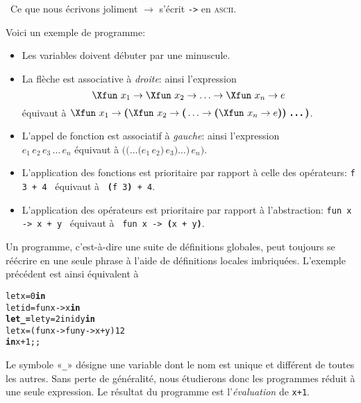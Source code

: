 \noindent\remarques \ Ce que nous écrivons joliment $\rightarrow$ s'écrit
\verb+->+ en \textsc{ascii}.

\bigskip

\noindent Voici un exemple de programme:

{\small
{}




}

\bigskip

\noindent\remarques

\begin{itemize}

  \item Les variables doivent débuter par une minuscule.

  \item La flèche est associative à \emph{droite}: ainsi l'expression
    \begin{equation*}
      \Xfun \,\, x_1 \rightarrow \Xfun \,\, x_2 \rightarrow \ldots
      \rightarrow \Xfun \,\, x_n \rightarrow e
    \end{equation*}
    équivaut à
     \(\Xfun \,\, x_1 \rightarrow \textbf{(}\Xfun \,\, x_2 \rightarrow
     \textbf{(}\ldots \rightarrow \textbf{(}\Xfun \,\, x_n \rightarrow
  e\textbf{)) \ldots)}\).


  \item L'appel de fonction est associatif à \emph{gauche}:
    ainsi l'expression\\
    \(e_1 \, e_2 \, e_3 \, \ldots \, e_n\)
    équivaut à \(\textbf{((\ldots (}e_1 \, e_2\textbf{)} \, e_3\textbf{)} 
    \ldots \textbf{)} \, e_n\textbf{)}\).

  \item L'application des fonctions est prioritaire par rapport à
    celle des opérateurs:
    \texttt{f 3 + 4} \ équivaut à \ \texttt{\textbf{(}f 3\textbf{)} +
      4}.

  \item L'application des opérateurs est prioritaire par rapport à
    l'abstraction:
    \texttt{fun x -> x + y} \ équivaut à \ \texttt{fun x ->
    \textbf{(}x + y\textbf{)}}.

\end{itemize}

\bigskip

\noindent Un programme, c'est-à-dire une suite de définitions globales, peut toujours se réécrire en une seule phrase à l'aide de définitions locales imbriquées. L'exemple précédent est ainsi équivalent à
\begin{alltt}
let x = 0 \textbf{in}
  let id = fun x -> x \textbf{in}
  \textbf{let _ =} let y = 2 in id y \textbf{in}
  let x = (fun x -> fun y -> x + y) 1 2 
\textbf{in} x+1;;
\end{alltt}
Le symbole «\verb|_|» désigne une variable dont le nom est unique et différent de toutes les autres. Sans perte de généralité, nous étudierons donc les programmes réduit à une seule expression. Le résultat du programme est l'\emph{évaluation} de \verb|x+1|.

